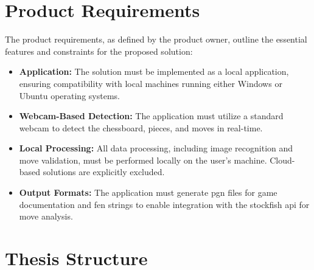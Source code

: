 \section{Product Requirements}

The product requirements, as defined by the product owner, outline the essential features and constraints for the proposed solution:

\begin{itemize}
    \item \textbf{Application:} The solution must be implemented as a local application, ensuring compatibility with local machines running either Windows or Ubuntu operating systems.

    \item \textbf{Webcam-Based Detection:} The application must utilize a standard webcam to detect the chessboard, pieces, and moves in real-time.

    \item \textbf{Local Processing:} All data processing, including image recognition and move validation, must be performed locally on the user's machine. Cloud-based solutions are explicitly excluded.

    \item \textbf{Output Formats:} The application must generate \gls{pgn} files for game documentation and \gls{fen} strings to enable integration with the \gls{stockfish} \gls{api} for move analysis.
\end{itemize}

\section{Thesis Structure}

